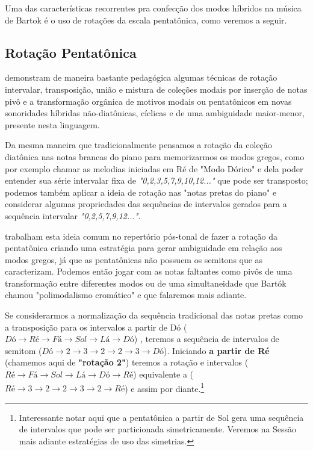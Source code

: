 \documentclass[
	12pt,				%
	openright,			%
	twoside,			%
	a4paper,			%
	english,			%
	french,				%
	spanish,			%
	brazil				%
	]{abntex2}
\begin{document}
Uma das características recorrentes pra confecção dos modos híbridos na música de Bartok é o uso de rotações da escala pentatônica, como veremos a seguir.


\subsection{Rotação Pentatônica}
\label{pentarota}
 
 demonstram de maneira bastante pedagógica algumas técnicas de rotação intervalar, transposição, união e mistura de coleções modais por inserção de notas pivô e a transformação orgânica de motivos modais ou pentatônicos em novas sonoridades híbridas não-diatônicas, cíclicas e de uma ambiguidade maior-menor, presente nesta linguagem. 

Da mesma maneira que tradicionalmente pensamos a rotação da coleção diatônica nas notas brancas do piano para memorizarmos os modos gregos, como por exemplo chamar as melodias iniciadas em Ré de "Modo Dórico" e dela poder entender sua série intervalar fixa de \textit{"0,2,3,5,7,9,10,12..."} que pode ser transposto; podemos também aplicar a ideia de rotação nas "notas pretas do piano" e considerar algumas propriedades das sequências de intervalos gerados para a sequência intervalar \textit{"0,2,5,7,9,12..."}.

 trabalham esta ideia comum no repertório pós-tonal de fazer a rotação da pentatônica criando uma estratégia para gerar ambiguidade em relação aos modos gregos, já que as pentatônicas não possuem os semitons que as caracterizam. Podemos então jogar com as notas faltantes como pivôs de uma transformação entre diferentes modos ou de uma simultaneidade que Bartók chamou "polimodalismo cromático" e que falaremos mais adiante. 

Se considerarmos a normalização da sequência tradicional das notas pretas como a transposição para os intervalos a partir de Dó ($Dó \rightarrow  Ré \rightarrow Fá \rightarrow Sol \rightarrow Lá \rightarrow Dó $) , teremos a sequência de intervalos de semitom ($Dó \rightarrow 2 \rightarrow  3 \rightarrow 2 \rightarrow 2  \rightarrow 3 \rightarrow Dó $). Iniciando \textbf{a partir de Ré} (chamemos aqui de \textbf{"rotação 2"}) teremos a rotação e intervalos ($Ré \rightarrow Fá \rightarrow Sol \rightarrow Lá \rightarrow Dó \rightarrow Ré $) equivalente a ($  Ré \rightarrow 3 \rightarrow  2 \rightarrow 2 \rightarrow 3  \rightarrow 2 \rightarrow Ré $) e assim por diante.\footnote{Interessante notar aqui que a pentatônica a partir de Sol gera uma sequência de intervalos que pode ser particionada simetricamente. Veremos na Sessão mais adiante estratégias de uso das simetrias.}
\end{document}
